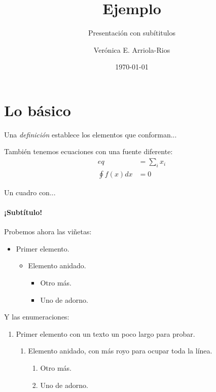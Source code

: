 \documentclass[aspectratio=169,usenames,dvipsnames,svgnames,table]{beamer}
\title{Ejemplo}
\subtitle{Presentación con subítitulos}
\author[Ver\'onica E. Arriola-Rios]{Verónica E. Arriola-Rios}
\institute{Facultad de Ciencias, UNAM}
\date{\today}
\begin{document}
\frame{\titlepage}

\section{Lo básico}

\begin{frame}
\begin{definition}[Definición]
 Una \emph{definición} establece los elementos que conforman...
\end{definition}

También tenemos ecuaciones con una fuente diferente:
\begin{align}
 eq &= \sum_{i} x_i \\
 \oint f(x) dx &= 0
\end{align}

\end{frame}



\begin{frame}{Un cuadro con...}
\framesubtitle{¡Subtítulo!}
Probemos ahora las viñetas:
\begin{itemize}
 \item Primer elemento.
 \begin{itemize}
  \item Elemento anidado.
  \begin{itemize}
   \item Otro más.
   \item Uno de adorno.
  \end{itemize}
 \end{itemize}
\end{itemize}

Y las enumeraciones:
\begin{enumerate}
 \item Primer elemento con un texto un poco largo para probar.
 \begin{enumerate}
  \item Elemento anidado, con más royo para ocupar toda la línea.
  \begin{enumerate}
   \item Otro más.
   \item Uno de adorno.
  \end{enumerate}
 \end{enumerate}
\end{enumerate}

\end{frame}
\end{document}
